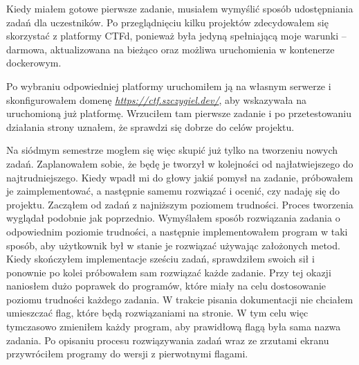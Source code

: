 \documentclass[language=polish,type=eng]{aghmodern}
\begin{document}
Kiedy miałem gotowe pierwsze zadanie, musiałem wymyślić sposób udostępniania zadań
dla uczestników. Po przeglądnięciu kilku projektów zdecydowałem się skorzystać
z platformy CTFd, ponieważ była jedyną spełniającą moje warunki -- darmowa, aktualizowana
na bieżąco oraz możliwa uruchomienia w kontenerze dockerowym.

Po wybraniu odpowiedniej platformy uruchomiłem ją na własnym serwerze i skonfigurowałem
domenę \emph{\url{https://ctf.szczygiel.dev/}}, aby wskazywała na uruchomioną już platformę.
Wrzuciłem tam pierwsze zadanie i po przetestowaniu działania strony uznałem, że sprawdzi
się dobrze do celów projektu.

Na siódmym semestrze mogłem się więc skupić już tylko na tworzeniu
nowych zadań. Zaplanowałem sobie, że będę je tworzył w kolejności od najłatwiejszego
do najtrudniejszego. Kiedy wpadł mi do głowy jakiś pomysł na zadanie, próbowałem
je zaimplementować, a następnie samemu rozwiązać i ocenić, czy nadaję się do projektu.
Zacząłem od zadań z najniższym poziomem trudności. Proces tworzenia wyglądał
podobnie jak poprzednio. Wymyślałem sposób rozwiązania zadania o odpowiednim poziomie
trudności, a następnie implementowałem program w taki sposób, aby użytkownik był
w stanie je rozwiązać używając założonych metod.
Kiedy skończyłem implementacje sześciu zadań, sprawdziłem swoich sił i
ponownie po kolei próbowałem sam rozwiązać każde zadanie.
Przy tej okazji naniosłem dużo poprawek do programów,
które miały na celu dostosowanie poziomu trudności każdego zadania. W trakcie
pisania dokumentacji nie chciałem umieszczać flag, które będą rozwiązaniami na stronie.
W tym celu więc tymczasowo zmieniłem każdy program, aby prawidłową flagą była
sama nazwa zadania. Po opisaniu procesu rozwiązywania zadań wraz ze zrzutami ekranu
przywróciłem programy do wersji z pierwotnymi flagami.
\end{document}
